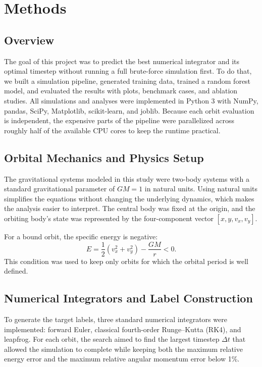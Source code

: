 \documentclass[12pt]{article}
\begin{document}
\section{Methods}

\subsection{Overview}
The goal of this project was to predict the best numerical integrator and its optimal timestep without running a full brute-force simulation first. To do that, we built a simulation pipeline, generated training data, trained a random forest model, and evaluated the results with plots, benchmark cases, and ablation studies. All simulations and analyses were implemented in Python 3 with NumPy, pandas, SciPy, Matplotlib, scikit-learn, and joblib. Because each orbit evaluation is independent, the expensive parts of the pipeline were parallelized across roughly half of the available CPU cores to keep the runtime practical.

\subsection{Orbital Mechanics and Physics Setup}
The gravitational systems modeled in this study were two-body systems with a standard gravitational parameter of $GM=1$ in natural units. Using natural units simplifies the equations without changing the underlying dynamics, which makes the analysis easier to interpret. The central body was fixed at the origin, and the orbiting body's state was represented by the four-component vector $\left[x, y, v_x, v_y\right]$.

For a bound orbit, the specific energy is negative:
\begin{equation}
    E = \frac{1}{2}\left(v_x^2+v_y^2\right) - \frac{GM}{r} < 0.
\end{equation}
This condition was used to keep only orbits for which the orbital period is well defined.

\subsection{Numerical Integrators and Label Construction}
To generate the target labels, three standard numerical integrators were implemented: forward Euler, classical fourth-order Runge--Kutta (RK4), and leapfrog. For each orbit, the search aimed to find the largest timestep $\Delta t$ that allowed the simulation to complete while keeping both the maximum relative energy error and the maximum relative angular momentum error below 1\%.
\end{document}
